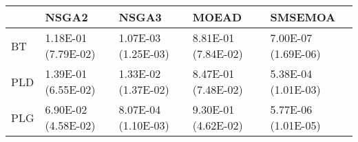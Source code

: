 \begin{tabular}{lllll}
\toprule
{} &                NSGA2 &                NSGA3 &                MOEAD &              SMSEMOA \\
\midrule
BT  &  1.18E-01 (7.79E-02) &  1.07E-03 (1.25E-03) &  8.81E-01 (7.84E-02) &  7.00E-07 (1.69E-06) \\
PLD &  1.39E-01 (6.55E-02) &  1.33E-02 (1.37E-02) &  8.47E-01 (7.48E-02) &  5.38E-04 (1.01E-03) \\
PLG &  6.90E-02 (4.58E-02) &  8.07E-04 (1.10E-03) &  9.30E-01 (4.62E-02) &  5.77E-06 (1.01E-05) \\
\bottomrule
\end{tabular}

